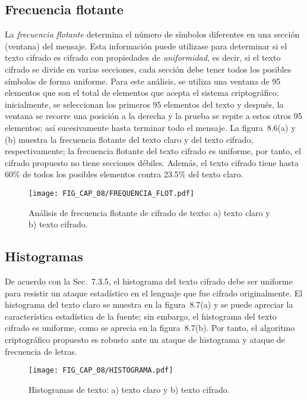 \subsection{Frecuencia flotante}
La \textit{frecuencia flotante} determina el número de símbolos diferentes en una sección (ventana) del mensaje. Esta información puede utilizase para determinar si el texto cifrado es cifrado con propiedades de \textit{uniformidad}, es decir, si el texto cifrado se divide en varias secciones, cada sección debe tener todos los posibles símbolos de forma uniforme. Para este análisis, se utiliza una ventana de 95 elementos que son el total de elementos que acepta el sistema criptográfico: inicialmente, se seleccionan los primeros 95 elementos del texto y después, la ventana se recorre una posición a la derecha y la prueba se repite a estos otros 95 elementos; así sucesivamente hasta terminar todo el mensaje. La figura~8.6(a) y (b) muestra la frecuencia flotante del texto claro y del texto cifrado, respectivamente; la frecuencia flotante del texto cifrado es uniforme, por tanto, el cifrado propuesto no tiene secciones débiles. Además, el texto cifrado tiene hasta 60\% de todos los posibles elementos contra 23.5\% del texto claro. 

\begin{figure}[!htbp] %
	\center
	\texttt{[image: FIG\_CAP\_08/FREQUENCIA\_FLOT.pdf]}  
	\caption{Análisis de frecuencia flotante de cifrado de texto: a) texto claro y b) texto cifrado.}
\end{figure}

\subsection{Histogramas}
De acuerdo con la Sec.~7.3.5, el histograma del texto cifrado debe ser uniforme para resistir un ataque estadístico en el lenguaje que fue cifrado originalmente. El histograma del texto claro se muestra en la figura~8.7(a) y se puede apreciar la característica estadística de la fuente; sin embargo, el histograma del texto cifrado es uniforme, como se aprecia en la figura~8.7(b). Por tanto, el algoritmo criptográfico propuesto es robusto ante un ataque de histograma y ataque de frecuencia de letras.  
  
\begin{figure}[!htbp] %
	\center
	\texttt{[image: FIG\_CAP\_08/HISTOGRAMA.pdf]}     
	\caption{Histogramas de texto: a) texto claro y b) texto cifrado.}
\end{figure}

